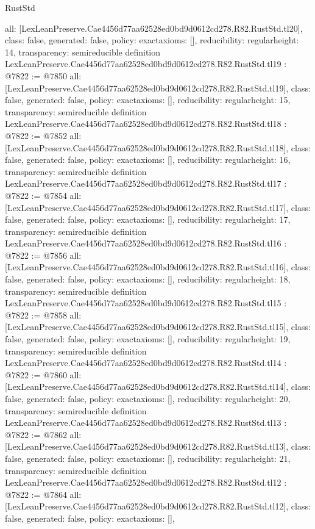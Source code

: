 \begin{lexlean}{RustStd}
\begin{coremodule}
{  all: [LexLeanPreserve.Cae4456d77aa62528ed0bd9d0612cd278.R82.RustStd.tl20],
  class: false,
  generated: false,
  policy: exact{axioms: []},
  reducibility: regular{height: 14},
  transparency: semireducible
}
definition LexLeanPreserve.Cae4456d77aa62528ed0bd9d0612cd278.R82.RustStd.tl19 : @7822 := @7850 {
  all: [LexLeanPreserve.Cae4456d77aa62528ed0bd9d0612cd278.R82.RustStd.tl19],
  class: false,
  generated: false,
  policy: exact{axioms: []},
  reducibility: regular{height: 15},
  transparency: semireducible
}
definition LexLeanPreserve.Cae4456d77aa62528ed0bd9d0612cd278.R82.RustStd.tl18 : @7822 := @7852 {
  all: [LexLeanPreserve.Cae4456d77aa62528ed0bd9d0612cd278.R82.RustStd.tl18],
  class: false,
  generated: false,
  policy: exact{axioms: []},
  reducibility: regular{height: 16},
  transparency: semireducible
}
definition LexLeanPreserve.Cae4456d77aa62528ed0bd9d0612cd278.R82.RustStd.tl17 : @7822 := @7854 {
  all: [LexLeanPreserve.Cae4456d77aa62528ed0bd9d0612cd278.R82.RustStd.tl17],
  class: false,
  generated: false,
  policy: exact{axioms: []},
  reducibility: regular{height: 17},
  transparency: semireducible
}
definition LexLeanPreserve.Cae4456d77aa62528ed0bd9d0612cd278.R82.RustStd.tl16 : @7822 := @7856 {
  all: [LexLeanPreserve.Cae4456d77aa62528ed0bd9d0612cd278.R82.RustStd.tl16],
  class: false,
  generated: false,
  policy: exact{axioms: []},
  reducibility: regular{height: 18},
  transparency: semireducible
}
definition LexLeanPreserve.Cae4456d77aa62528ed0bd9d0612cd278.R82.RustStd.tl15 : @7822 := @7858 {
  all: [LexLeanPreserve.Cae4456d77aa62528ed0bd9d0612cd278.R82.RustStd.tl15],
  class: false,
  generated: false,
  policy: exact{axioms: []},
  reducibility: regular{height: 19},
  transparency: semireducible
}
definition LexLeanPreserve.Cae4456d77aa62528ed0bd9d0612cd278.R82.RustStd.tl14 : @7822 := @7860 {
  all: [LexLeanPreserve.Cae4456d77aa62528ed0bd9d0612cd278.R82.RustStd.tl14],
  class: false,
  generated: false,
  policy: exact{axioms: []},
  reducibility: regular{height: 20},
  transparency: semireducible
}
definition LexLeanPreserve.Cae4456d77aa62528ed0bd9d0612cd278.R82.RustStd.tl13 : @7822 := @7862 {
  all: [LexLeanPreserve.Cae4456d77aa62528ed0bd9d0612cd278.R82.RustStd.tl13],
  class: false,
  generated: false,
  policy: exact{axioms: []},
  reducibility: regular{height: 21},
  transparency: semireducible
}
definition LexLeanPreserve.Cae4456d77aa62528ed0bd9d0612cd278.R82.RustStd.tl12 : @7822 := @7864 {
  all: [LexLeanPreserve.Cae4456d77aa62528ed0bd9d0612cd278.R82.RustStd.tl12],
  class: false,
  generated: false,
  policy: exact{axioms: []},
}
\end{coremodule}
\end{lexlean}
